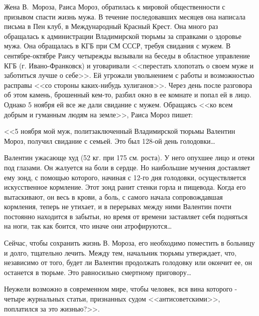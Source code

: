 \documentclass{book}
\begin{document}
Жена В.~Мороза, Раиса Мороз, обратилась к мировой общественности с призывом спасти жизнь мужа. В течение последовавших месяцев она написала письма в Пен клуб, в Международный Красный Крест. Она много раз обращалась к администрации Владимирской тюрьмы за справками о здоровье мужа. Она обращалась в КГБ при СМ СССР, требуя свидания с мужем. В сентябре-октябре Раису четырежды вызывали на бесе­ды в областное управление КГБ (г. Ивано-Франковск) и уговаривали <<перестать хлопотать о своем муже и заботиться лучше о себе>>. Ей угрожали увольнением с работы и возможностью расправы <<со стороны каких-нибудь хулиганов>>. Через день после разговора об этом камень, брошенный кем-то, разбил окно в ее комнате и попал ей в лицо. Однако 5 ноября ей все же дали свидание с мужем. Обращаясь <<ко всем добрым и гуманным людям на земле>>, Раиса Мороз пишет:

<<5 ноября мой муж, политзаключенный Владимирской тюрьмы Валентин Мороз, получил свидание с семьей. Это был 128-ой день голодовки\ldots

Валентин ужасающе худ (52 кг. при 175 см. роста). У него опухшее лицо и отеки под глазами. Он жалуется на боли в сердце. Но наибольшие мучения доставляет ему зонд, с помощью которого, начиная с 12-го дня голодовки, осуществляется искусственное кормление. Этот зонд ранит стенки горла и пищевода. Когда его вытаскивают, он весь в крови, а боль, с самого начала сопровождавшая кормления, теперь не утихает, и в перерывах между ними Валентин почти постоянно находится в забытьи, но время от времени заставляет себя подняться на ноги, так как боится, что иначе они атрофируются\ldots

Сейчас, чтобы сохранить жизнь В. Мороза, его необходимо поместить в больницу и долго, тщательно лечить. Между тем, начальник тюрьмы утверждает, что, независимо от того, будет ли Валентин продолжать голодовку или окончит ее, он останется в тюрьме. Это равносильно смертному приговору\ldots

Неужели возможно в современном мире, чтобы человек, вся вина которого - четыре журнальных статьи, признанных судом <<антисоветскими>>, поплатился за это жизнью?>>.
\end{document}
